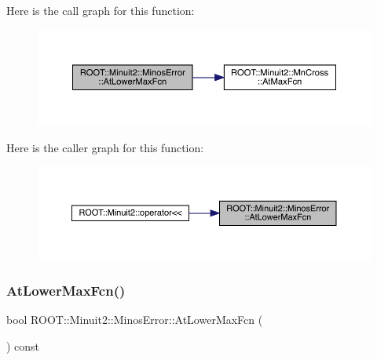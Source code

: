 Here is the call graph for this function\+:
\nopagebreak
\begin{figure}[H]
\begin{center}
\leavevmode
\includegraphics[width=350pt]{d2/dd1/classROOT_1_1Minuit2_1_1MinosError_a6ec22eac3b7dd1a281f1df710ed1dc74_cgraph}
\end{center}
\end{figure}
Here is the caller graph for this function\+:\nopagebreak
\begin{figure}[H]
\begin{center}
\leavevmode
\includegraphics[width=350pt]{d2/dd1/classROOT_1_1Minuit2_1_1MinosError_a6ec22eac3b7dd1a281f1df710ed1dc74_icgraph}
\end{center}
\end{figure}
\mbox{\label{classROOT_1_1Minuit2_1_1MinosError_a6ec22eac3b7dd1a281f1df710ed1dc74}} 
\subsubsection{\texorpdfstring{AtLowerMaxFcn()}{AtLowerMaxFcn()}\hspace{0.1cm}{\footnotesize\ttfamily [2/2]}}
{\footnotesize\ttfamily bool R\+O\+O\+T\+::\+Minuit2\+::\+Minos\+Error\+::\+At\+Lower\+Max\+Fcn (\begin{DoxyParamCaption}{ }\end{DoxyParamCaption}) const\hspace{0.3cm}{\ttfamily [inline]}}

